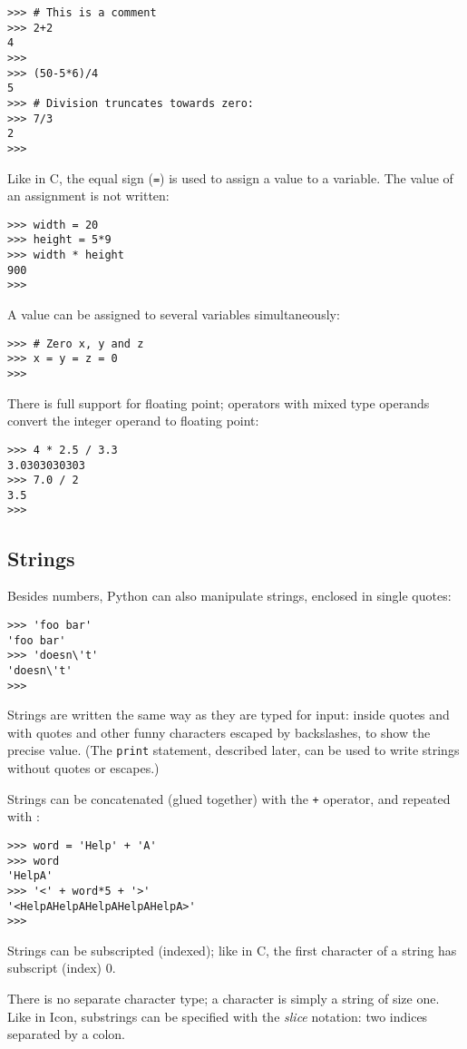 \bcode\begin{verbatim}
>>> # This is a comment
>>> 2+2
4
>>> 
>>> (50-5*6)/4
5
>>> # Division truncates towards zero:
>>> 7/3
2
>>> 
\end{verbatim}\ecode
%
Like in C, the equal sign ({\tt =}) is used to assign a value to a
variable.  The value of an assignment is not written:

\bcode\begin{verbatim}
>>> width = 20
>>> height = 5*9
>>> width * height
900
>>> 
\end{verbatim}\ecode
%
A value can be assigned to several variables simultaneously:

\bcode\begin{verbatim}
>>> # Zero x, y and z
>>> x = y = z = 0
>>>
\end{verbatim}\ecode
%
There is full support for floating point; operators with mixed type
operands convert the integer operand to floating point:

\bcode\begin{verbatim}
>>> 4 * 2.5 / 3.3
3.0303030303
>>> 7.0 / 2
3.5
>>> 
\end{verbatim}\ecode

\subsection{Strings}

Besides numbers, Python can also manipulate strings, enclosed in
single quotes:

\bcode\begin{verbatim}
>>> 'foo bar'
'foo bar'
>>> 'doesn\'t'
'doesn\'t'
>>> 
\end{verbatim}\ecode
%
Strings are written the same way as they are typed for input: inside
quotes and with quotes and other funny characters escaped by
backslashes, to show the precise value.  (The {\tt print} statement,
described later, can be used to write strings without quotes or
escapes.)

Strings can be concatenated (glued together) with the {\tt +}
operator, and repeated with {\tt *}:

\bcode\begin{verbatim}
>>> word = 'Help' + 'A'
>>> word
'HelpA'
>>> '<' + word*5 + '>'
'<HelpAHelpAHelpAHelpAHelpA>'
>>> 
\end{verbatim}\ecode
%
Strings can be subscripted (indexed); like in C, the first character of
a string has subscript (index) 0.

There is no separate character type; a character is simply a string of
size one.  Like in Icon, substrings can be specified with the {\em
slice} notation: two indices separated by a colon.

